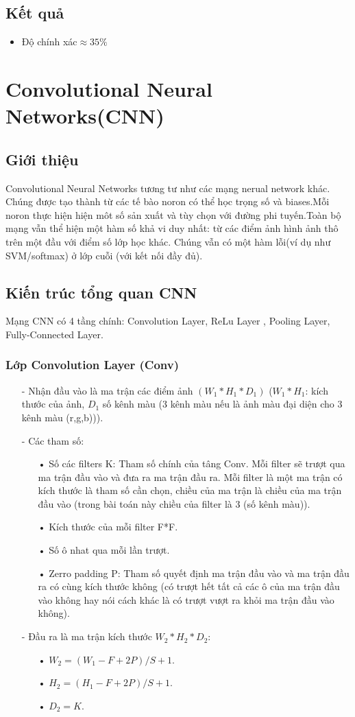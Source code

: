 \documentclass[a4paper,12pt]{report}
\begin{document}
\subsection{Kết quả}
\begin{itemize}
\item Độ chính xác$\approx 35 \%$  
\end{itemize}
\section{Convolutional Neural Networks(CNN)}
\subsection{Giới thiệu}
Convolutional Neural Networks tương tư như các mạng nerual network khác. Chúng được tạo thành từ các tế bào noron có thể học trọng số và biases.Mỗi noron thực hiện hiện môt số sản xuất và tùy chọn với đường phi tuyến.Toàn bộ mạng vẫn thể hiện một hàm số khả vi duy nhất: từ các điểm ảnh hình ảnh thô trên một đầu với điểm số lớp học khác. Chúng vẫn có một hàm lỗi(ví dụ như SVM/softmax) ở lớp cuỗi (với kết nối đầy đủ).
\subsection{Kiến trúc tổng quan CNN}
Mạng CNN có 4 tầng chính: Convolution Layer, ReLu Layer , Pooling Layer, Fully-Connected Layer.
\subsubsection{Lớp Convolution Layer (Conv)}
\begin{itemize}
\item[-] Nhận đầu vào là ma trận các điểm ảnh $(W_1*H_1*D_1)$ ($W_1*H_1$: kích thước của ảnh, $D_1$ số kênh màu (3 kênh màu nếu là ảnh màu đại diện cho 3 kênh màu (r,g,b))).
\item[-] Các tham số:
\begin{itemize}
\item[•] Số các filters K: Tham số chính của tâng Conv. Mỗi filter sẽ trượt qua ma trận đầu vào và đưa ra ma trận đầu ra. Mỗi filter là một ma trận có kích thước là tham số cần chọn, chiều của ma trận là chiều của ma trận đầu vào (trong bài toán này chiều của filter là 3 (số kênh màu)).
\item[•] Kích thước của mỗi filter F*F.
\item[•] Số ô nhat qua mỗi lần trượt.
\item[•] Zerro padding P: Tham số quyết định ma trận đầu vào và ma trận đầu ra có cùng kích thước không (có trượt hết tất cả các ô của ma trận đầu vào không hay nói cách khác là có trượt vượt ra khỏi ma trận đầu vào không).
\end{itemize}
\item[-] Đầu ra là ma trận kích thước $W_2*H_2*D_2$:
\begin{itemize}
\item[•] $W_2 = (W_1 - F + 2P)/S + 1$.
\item[•] $H_2 = (H_1 - F + 2P)/S + 1$.
\item[•] $D_2 = K$.
\end{itemize}
\end{itemize}
\end{document}
